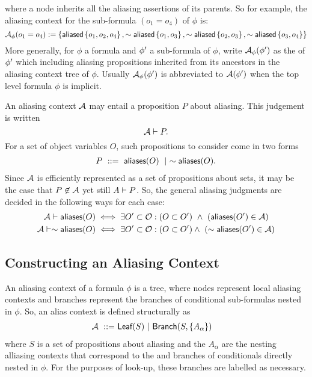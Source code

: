 %
where a node inherits all the aliasing assertions of its parents.
So for example, the aliasing context for the sub-formula $(o_1 = o_4)$ of $\phi$ is:
$$
  \mathcal{A}_\phi(o_1 = o_4) :=
  \left\{ 
    \textsf{aliased}\left\{ o_1, o_2, o_4 \right\},
    \sim \textsf{aliased}\left\{ o_1, o_3 \right\},
    \sim \textsf{aliased}\left\{ o_2, o_3 \right\},
    \sim \textsf{aliased}\left\{ o_3, o_4 \right\}
   \right\}
$$
More generally, for $\phi$ a formula and $\phi^\prime$ a sub-formula of $\phi$, write $\mathcal{A}_\phi(\phi^\prime)$ as the  of $\phi^\prime$ which including aliasing propositions inherited from its ancestors in the aliasing context tree of $\phi$. Usually $\mathcal{A}_\phi(\phi^\prime)$ is abbreviated to $\mathcal{A}(\phi^\prime)$ when the top level formula $\phi$ is implicit.

An aliasing context $\mathcal{A}$ may entail a proposition $P$ about aliasing. This judgement is written
$$
\mathcal{A} \vdash P.
$$
For a set of object variables $O$, such propositions to consider come in two forms
\begin{align*}
P \ ::= \ \textsf{aliases}(O) \ \mid \ \sim \textsf{aliases}(O).
\end{align*}
Since $\mathcal{A}$ is efficiently represented as a set of propositions about sets, it may be the case that $P \not\in \mathcal{A}$ yet still $A \vdash P$.
So, the general aliasing judgments are decided in the following ways for each case:
\begin{align*}
\mathcal{A} \vdash \textsf{aliases}(O)
&\iff
\exists O^\prime \subset \mathcal{O} : (O \subset O^\prime) \ \land \ (\textsf{aliases}(O^\prime) \in \mathcal{A})
\\
\mathcal{A} \vdash \sim \textsf{aliases}(O)
&\iff
\exists O^\prime \subset \mathcal{O} : (O \subset O^\prime) \land \ (\sim \textsf{aliases}(O^\prime) \in \mathcal{A})
\end{align*}

\subsection{Constructing an Aliasing Context}

An aliasing context of a formula $\phi$ is a tree, where nodes represent local aliasing contexts and branches represent the branches of conditional sub-formulas nested in $\phi$. So, an alias context is defined structurally as
\begin{align*}
  \mathcal{A} \ ::=
  & \ \textsf{Leaf}(S) \ | \
  \textsf{Branch}(S, \left\{  A_\alpha  \right\})
\end{align*}
where $S$ is a set of propositions about aliasing and the $A_\alpha$ are the nesting alliasing contexts that correspond to the  and  branches of conditionals directly nested in $\phi$. For the purposes of look-up, these branches are labelled as necessary.

